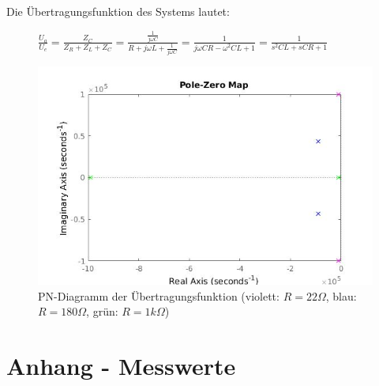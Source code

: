 \documentclass[12pt,a4paper,titlepage]{article}
\begin{document}
\noindent Die \"Ubertragungsfunktion des Systems lautet:
\begin{figure}[H]
  \centering
  $\frac{U_a}{U_e} = \frac{Z_C}{Z_R+Z_L+Z_C} = \frac{\frac{1}{j\omega C}}{R+j\omega L+\frac{1}{j\omega C}} = \frac{1}{j\omega CR-\omega^2CL+1} = \frac{1}{s^2CL+sCR+1}$
\end{figure}


\begin{figure}[H]
  \centering
  \includegraphics[width=150mm]{pnd.jpg}
  \caption{PN-Diagramm der \"Ubertragungsfunktion (violett: $R=22\Omega$, blau: $R=180\Omega$, gr\"un: $R=1k\Omega$)}
\end{figure}

\section{Anhang - Messwerte}
\end{document}
